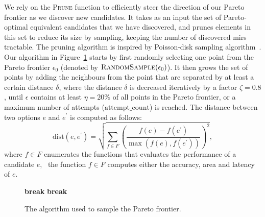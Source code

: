 We rely on the \textsc{Prune} function to efficiently steer the direction
of our Pareto frontier as we discover new candidates.  It takes as an
input the set of Pareto-optimal equivalent candidates that we have
discovered, and prunes elements in this set to reduce its size by sampling,
keeping the number of discovered \glspl{mir} tractable.  The pruning
algorithm is inspired by Poisson-disk sampling algorithm~\cite{bridson07}.
Our algorithm in Figure~\ref{lo:alg:sample} starts by first randomly
selecting one point from the Pareto frontier $\epsilon_0$ (denoted by
$\textsc{RandomSample}(\epsilon_0)$).  It then grows the set of points by
adding the neighbours from the point that are separated by at least a certain
distance $\delta$, where the distance $\delta$ is decreased iteratively by
a factor $\zeta = 0.8$, until $\epsilon$ contains at least $\eta = 20\%$
of all points in the Pareto frontier, or a maximum number of attempts
($\mathrm{attempt\_count}$) is reached.  The distance between two options $e$
and $e^\prime$ is computed as follows:
\begin{equation}
    \mathrm{dist} \left(e, e^\prime\right)
    = \sqrt{
        \sum_{f \in F} {\left(
            \frac{f(e) - f(e^\prime)}{\max(f(e), f(e^\prime))}
        \right)}^2
    },
\end{equation}
where $f \in F$ enumerates the functions that evaluates the performance of a
candidate $e$, \ie~the function $f \in F$ computes either the accuracy, area
and latency of $e$.

\begin{figure}[ht]
    \centering
    \begin{algorithmic}
        \singlespacing%
                            \State\textbf{break}
                        \EndIf%
                        \EndIf%
                    \EndFor%
                \EndFor%
                \If{$\left|\epsilon\right| \geq \eta \left|\epsilon_0\right|$}
                    \State\textbf{break}
                \EndIf%
                \State{$\delta = \zeta\delta$}
            \EndFor%
            \State{\Return{$\epsilon$}}
        \EndFunction%
    \end{algorithmic}
    \caption{%
        The algorithm used to sample the Pareto frontier.
    }\label{lo:alg:sample}
\end{figure}

